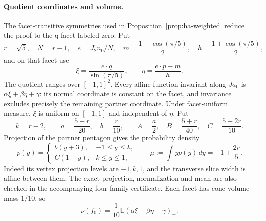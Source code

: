 \paragraph{Quotient coordinates and volume.}
The facet-transitive symmetries used in Proposition~\ref{prop:ha-weighted}
reduce the proof to the q-facet labeled zero. Put
\[
 r=\sqrt5,\quad N=r-1,\quad e=J_2n_0/N,\quad
 m=\frac{1-\cos(\pi/5)}2,\quad h=\frac{1+\cos(\pi/5)}2,
\]
and on that facet use
\[
 \xi=\frac{e\cdot q}{\sin(\pi/5)},\qquad
 \eta=\frac{e\cdot p-m}{h}.
\]
The quotient ranges over $[-1,1]^2$. Every affine function invariant along
$Ja_0$ is $\alpha\xi+\beta\eta+\gamma$: its normal coordinate is constant
on the facet, and invariance excludes precisely the remaining partner
coordinate. Under facet-uniform measure, $\xi$ is uniform on $[-1,1]$ and
independent of $\eta$. Put
\[
 k=r-2,\qquad a=\frac{5-r}{20},\quad b=\frac r{10},\qquad
 A=\frac a2,\quad B=\frac{5+r}{40},\quad C=\frac{5+2r}{10}.
\]
Projection of the partner pentagon gives the probability density
\begin{equation}\label{eq:ha-quotient-density}
 p(y)=\begin{cases}b(y+3),&-1\leq y\leq k,\\
                   C(1-y),&k\leq y\leq1,
       \end{cases}
 \qquad \mu:=\int yp(y)\,dy=-1+\frac{2r}{5}.
\end{equation}
Indeed its vertex projection levels are $-1,k,1$, and the transverse slice
width is affine between them. The exact projection, normalization and mean
are also checked in the accompanying four-family certificate. Each facet
has cone-volume mass $1/10$, so
\begin{equation}\label{eq:ha-quotient-volume}
 \nu(f_0)=\frac1{10}\mathbb E
                (\alpha\xi+\beta\eta+\gamma)_+.
\end{equation}

